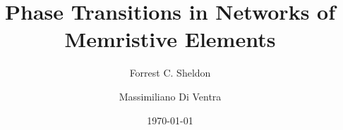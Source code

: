 \documentclass[aps,prl,preprint,groupedaddress]{revtex4-1}
\begin{document}

\title{Phase Transitions in Networks of Memristive Elements}


\author{Forrest C. Sheldon}

\author{Massimiliano Di Ventra}


\date{\today}

\begin{abstract}
\end{abstract}

\pacs{}

\maketitle
\end{document}
